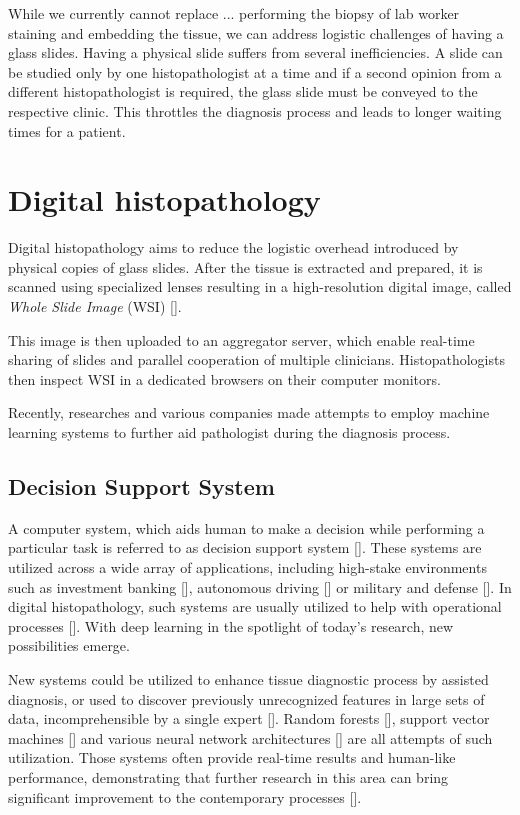 While we currently cannot replace ... performing the biopsy of lab worker staining and embedding the tissue, we can address logistic challenges of having a glass slides. Having a physical slide suffers from several inefficiencies. A slide can be studied only by one histopathologist at a time and if a second opinion from a different histopathologist is required, the glass slide must be conveyed to the respective clinic. This throttles the diagnosis process and leads to longer waiting times for a patient.

\section{Digital histopathology}

Digital histopathology aims to reduce the logistic overhead introduced by physical copies of glass slides. After the tissue is extracted and prepared, it is scanned using specialized lenses resulting in a high-resolution digital image, called \emph{Whole Slide Image} (WSI) [].

This image is then uploaded to an aggregator server, which enable real-time sharing of slides and parallel cooperation of multiple clinicians. Histopathologists then inspect WSI in a dedicated browsers on their computer monitors.


Recently, researches and various companies made attempts to employ machine learning systems to further aid pathologist during the diagnosis process. 

\subsection*{Decision Support System}

A computer system, which aids human to make a decision while performing a particular task is referred to as decision support system []. These systems are utilized across a wide array of applications, including high-stake environments such as investment banking [], autonomous driving [] or military and defense []. In digital histopathology, such systems are usually utilized to help with operational processes []. With deep learning in the spotlight of today's research, new possibilities emerge.

New systems could be utilized to enhance tissue diagnostic process by assisted diagnosis, or used to discover previously unrecognized features in large sets of data, incomprehensible by a single expert [].
Random forests [], support vector machines [] and various neural network architectures [] are all attempts of such utilization. Those systems often provide real-time results and human-like performance, demonstrating that further research in this area can bring significant improvement to the contemporary processes [].

